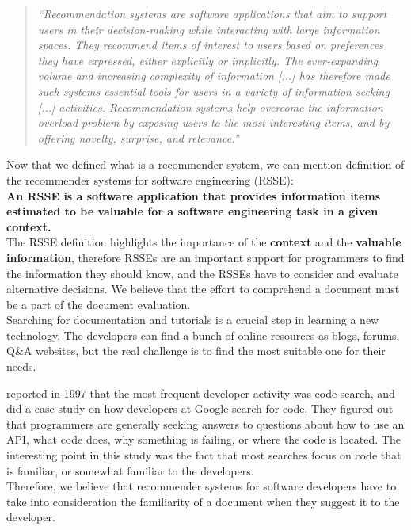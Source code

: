 \documentclass[12pt,mscthesis]{usiinfthesis}
\begin{document}
	  \blockquote{\textit{``Recommendation systems are software applications that aim to support users in their decision-making while interacting with large information spaces. They recommend items of interest to users based on preferences they have expressed, either explicitly or implicitly. The ever-expanding volume and increasing complexity of information [...] has therefore made such systems essential tools for users in a variety of information seeking [...] activities. Recommendation systems help overcome the information overload problem by exposing users to the most interesting items, and by offering novelty, surprise, and relevance.''}}
	Now that we defined what is a recommender system, we can mention \citet{RecommendationSystemsforSoftwareEngineering} definition of the recommender systems for software engineering (RSSE):\\

	\textbf{An RSSE is a software application that provides information items estimated to be valuable for a software engineering task in a given context.}\\

	The RSSE definition highlights the importance of the \textbf{context} and the \textbf{valuable information}, therefore RSSEs are an important support for programmers to find the information they should know, and the RSSEs have to consider and evaluate alternative decisions. We believe that the effort to comprehend a document must be a part of the document evaluation.\\


	Searching for documentation and tutorials is a crucial step in learning a new technology. The developers can find a bunch of online resources as blogs, forums, Q\&A websites, but the real challenge is to find the most suitable one for their needs.



	\citet{Singer-1997} reported in 1997 that the most frequent developer activity was code search, and \citet{Sadowski:2015} did a case study on how developers at Google search for code. They figured out that programmers are generally seeking answers to questions about how to use an API, what code does, why something is failing, or where the code is located. The interesting point in this study was the fact that most searches focus on code that is familiar, or somewhat familiar to the developers.\\
	Therefore, we believe that recommender systems for software developers have to take into consideration the familiarity of a document when they suggest it to the developer. 
\end{document}
